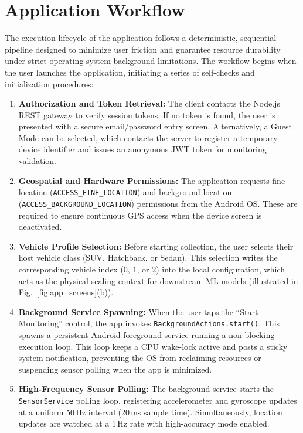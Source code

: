 \documentclass[conference]{IEEEtran}
\begin{document}
\section{Application Workflow}
\label{sec:app_workflow}
The execution lifecycle of the application follows a deterministic, sequential pipeline designed to minimize user friction and guarantee resource durability under strict operating system background limitations. The workflow begins when the user launches the application, initiating a series of self-checks and initialization procedures:

\begin{enumerate}
    \item \textbf{Authorization and Token Retrieval:} The client contacts the Node.js REST gateway to verify session tokens. If no token is found, the user is presented with a secure email/password entry screen. Alternatively, a Guest Mode can be selected, which contacts the server to register a temporary device identifier and issues an anonymous JWT token for monitoring validation.
    \item \textbf{Geospatial and Hardware Permissions:} The application requests fine location (\texttt{ACCESS\_FINE\_LOCATION}) and background location (\texttt{ACCESS\_BACKGROUND\_LOCATION}) permissions from the Android OS. These are required to ensure continuous GPS access when the device screen is deactivated.
    \item \textbf{Vehicle Profile Selection:} Before starting collection, the user selects their host vehicle class (SUV, Hatchback, or Sedan). This selection writes the corresponding vehicle index ($0$, $1$, or $2$) into the local configuration, which acts as the physical scaling context for downstream ML models (illustrated in Fig.~\ref{fig:app_screens}(b)).
    \item \textbf{Background Service Spawning:} When the user taps the ``Start Monitoring'' control, the app invokes \texttt{BackgroundActions.start()}. This spawns a persistent Android foreground service running a non-blocking execution loop. This loop keeps a CPU wake-lock active and posts a sticky system notification, preventing the OS from reclaiming resources or suspending sensor polling when the app is minimized.
    \item \textbf{High-Frequency Sensor Polling:} The background service starts the \texttt{SensorService} polling loop, registering accelerometer and gyroscope updates at a uniform 50\,Hz interval (20\,ms sample time). Simultaneously, location updates are watched at a 1\,Hz rate with high-accuracy mode enabled.

\end{enumerate}
\end{document}
